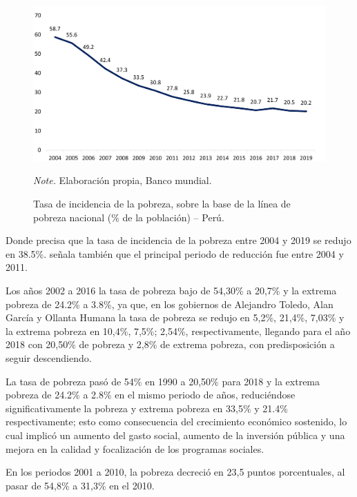 \begin{figure}[H]
    \caption{Tasa de incidencia de la pobreza, sobre la base de la línea de pobreza nacional (\% de la población) – Perú.}
    \includegraphics[scale=0.8]{images/chapter1/Imagen1.jpg}
    \label{fig:Figure1}  
    
     \begin{tablenotes}
     {\small
         \textit{Note.} Elaboración propia, Banco mundial.
     }
     \end{tablenotes}
\end{figure}

Donde precisa que la tasa de incidencia de la pobreza entre 2004 y 2019 se redujo en 38.5\%. señala también que el principal periodo de reducción fue entre 2004 y 2011. 

Los años 2002 a 2016 la tasa de pobreza bajo de 54,30\% a 20,7\% y la extrema pobreza de 24.2\% a 3.8\%, ya que, en los gobiernos de Alejandro Toledo, Alan García y Ollanta Humana la tasa de pobreza se redujo en 5,2\%, 21,4\%, 7,03\% y la extrema pobreza en 10,4\%, 7,5\%; 2,54\%, respectivamente, llegando para el año 2018 con 20,50\% de pobreza y 2,8\% de extrema pobreza, con predisposición a seguir descendiendo. 

La tasa de pobreza pasó de 54\% en 1990 a 20,50\% para 2018 y la extrema pobreza de 24.2\% a 2.8\% en el mismo periodo de años, reduciéndose significativamente la pobreza y extrema pobreza en 33,5\% y 21.4\% respectivamente; esto como consecuencia del crecimiento económico sostenido, lo cual implicó un aumento del gasto social, aumento de la inversión pública y una mejora en la calidad y focalización de los programas sociales.

En los periodos 2001 a 2010, la pobreza decreció en 23,5 puntos porcentuales, al pasar de 54,8\% a 31,3\% en el 2010.

